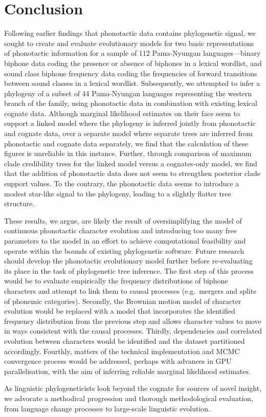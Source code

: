 \documentclass[]{article}
\begin{document}
\hypertarget{pn-tree-conclusion}{%
\section{Conclusion}\label{pn-tree-conclusion}}

Following earlier findings that phonotactic data contains phylogenetic signal, we sought to create and evaluate evolutionary models for two basic representations of phonotactic information for a sample of 112 Pama-Nyungan languages---binary biphone data coding the presence or absence of biphones in a lexical wordlist, and sound class biphone frequency data coding the frequencies of forward transitions between sound classes in a lexical wordlist. Subsequently, we attempted to infer a phylogeny of a subset of 44 Pama-Nyungan languages representing the western branch of the family, using phonotactic data in combination with existing lexical cognate data. Although marginal likelihood estimates on their face seem to support a linked model where the phylogeny is inferred jointly from phonotactic and cognate data, over a separate model where separate trees are inferred from phonotactic and cognate data separately, we find that the calculation of these figures is unreliable in this instance. Further, through comparison of maximum clade credibility trees for the linked model versus a cognates-only model, we find that the addition of phonotactic data does not seem to strengthen posterior clade support values. To the contrary, the phonotactic data seems to introduce a modest star-like signal to the phylogeny, leading to a slightly flatter tree structure.

These results, we argue, are likely the result of oversimplifying the model of continuous phonotactic character evolution and introducing too many free parameters to the model in an effort to achieve computational feasibility and operate within the bounds of existing phylogenetic software. Future research should develop the phonotactic evolutionary model further before re-evaluating its place in the task of phylogenetic tree inference. The first step of this process would be to evaluate empirically the frequency distributions of biphone characters and attempt to link them to causal processes (e.g.~mergers and splits of phonemic categories). Secondly, the Brownian motion model of character evolution would be replaced with a model that incorporates the identified frequency distribution from the previous step and allows character values to move in ways consistent with the causal processes. Thirdly, dependencies and correlated evolution between characters would be identified and the dataset partitioned accordingly. Fourthly, matters of the technical implementation and MCMC convergence process would be addressed, perhaps with advances in GPU parallelisation, with the aim of inferring reliable marginal likelihood estimates.

As linguistic phylogeneticists look beyond the cognate for sources of novel insight, we advocate a methodical progression and thorough methodological evaluation, from language change processes to large-scale linguistic evolution.

\printbibliography
\end{document}
